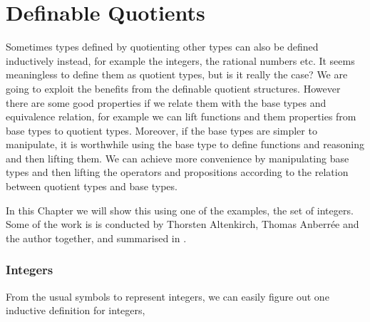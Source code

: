 \chapter{Definable Quotients}


Sometimes types defined by quotienting other
types can also be defined inductively instead, for example the integers,
the rational numbers etc. It seems meaningless
to define them as quotient types, but is it really the case?
We are going to exploit the benefits from the definable quotient structures.
However there are some good
properties if we relate them with the base types and equivalence
relation, for example we can lift functions and them properties from base types to
quotient types. Moreover, if the base types are simpler to manipulate,
it is worthwhile using the base type to define functions and reasoning
and then lifting them. We can achieve more convenience by manipulating base types and then lifting the operators and propositions according to the relation between quotient types and base types.

In this Chapter we will show this using one of the examples, the set
of integers. Some of the work is is conducted by Thorsten Altenkirch,
Thomas Anberr\'{e}e and the author together, and summarised in \cite{aan} .


\subsection{Integers}

From the usual symbols to represent integers, we can easily figure out
one inductive definition for integers,

\begin{code}
\\
%
\\
\>  \AgdaSymbol{:}  \<%
\\
\>[0]\<[2]%
\>[2]\AgdaInductiveConstructor{+\_} \AgdaSymbol{:}   \<%
\\
\>[0]\<[2]%
\>[2] \AgdaSymbol{:} \<%
\\
\>[0]\<[2]%
\>[2]\AgdaInductiveConstructor{-\_} \AgdaSymbol{:}   \<%
\\
%
\\
\end{code}

